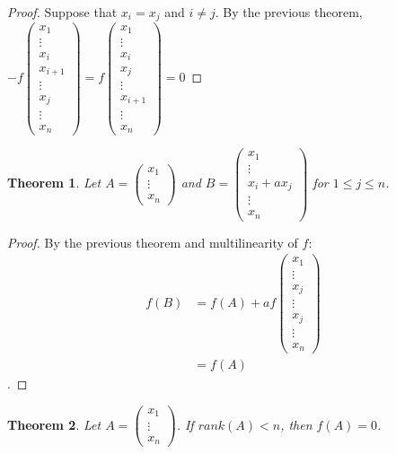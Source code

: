 \documentclass{article}
\newtheorem{thm}{Theorem}
\begin{document}
\begin{proof}
	Suppose that $x_i=x_j$ and $i\neq j$. By the previous theorem, \\ $-f\begin{pmatrix}x_1 \\ \vdots \\ x_{i} \\ x_{i+1} \\ \vdots \\ x_j \\ \vdots \\ x_n \end{pmatrix}=f\begin{pmatrix}x_1 \\ \vdots \\ x_i \\ x_{j} \\ \vdots \\ x_{i+1} \\ \vdots \\ x_n \end{pmatrix}=0$	
\end{proof}
\begin{thm}
Let $A=\begin{pmatrix}x_1 \\ \vdots \\ x_n	\end{pmatrix}$ and $B=\begin{pmatrix}x_1 \\ \vdots \\ x_i+ax_j \\ \vdots \\ x_n \end{pmatrix}$
for $1 \leq j \leq n$.
	
\end{thm}
\begin{proof}
By the previous theorem and multilinearity of $f$:
\begin{align}
f(B)&= f(A)+af\begin{pmatrix}x_1 \\ \vdots \\ x_j \\ \vdots \\ x_j \\ \vdots \\ x_n\end{pmatrix} \\ 
&=f(A)
\end{align}.
\end{proof}
\begin{thm}
Let $A=\begin{pmatrix}x_1 \\ \vdots \\ x_n\end{pmatrix}$. If $rank(A)<n$, then $f(A)=0$.
	
\end{thm}
\end{document}
